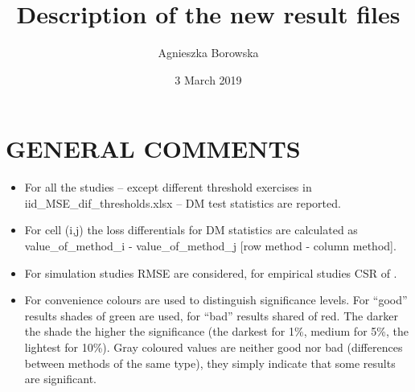 \documentclass[a4paper,10pt]{article} %
\title{Description of the new result files}
\author{Agnieszka Borowska}
\date{3 March 2019}
\begin{document}
\maketitle


\section{GENERAL COMMENTS}

\begin{itemize}
\item For all the studies -- except different threshold exercises in 
iid\_MSE\_dif\_thresholds.xlsx -- DM test statistics are reported. 
\item For cell (i,j) the loss differentials for DM statistics 
are calculated as value\_of\_method\_i - value\_of\_method\_j [row method - column method].
\item For simulation studies RMSE are considered, for empirical studies
CSR of \citet{CL}.
\item  For convenience colours are used to distinguish significance levels.
For ``good'' results shades of green are used, for ``bad'' results shared of red. The darker the shade the higher the significance (the darkest for 1\%, medium for 5\%, the lightest for 10\%). Gray coloured values are neither good nor bad (differences between methods of the same type), they simply indicate that some results are significant.
\end{itemize}
\end{document}
